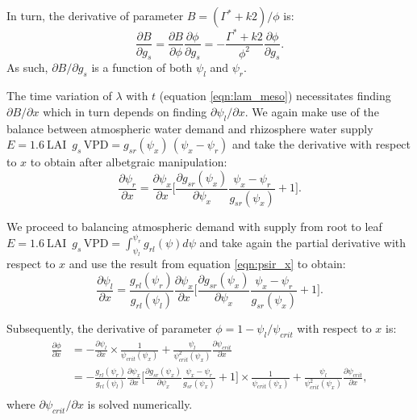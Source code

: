 \documentclass[utf8]{frontiersSCNS} %
\begin{document}
In turn, the derivative of parameter $B = (\Gamma^* + k2) / \phi$ is:
\begin{equation}
    \label{eqn:B_gs}
    \frac{\partial B}{\partial g_s} = \frac{\partial B}{\partial \phi} \frac{\partial \phi}{\partial g_s} = -\frac{\Gamma^* + k2}{\phi^2} \frac{\partial \phi}{\partial g_s}.
\end{equation}
As such, $\partial B / \partial g_s$ is a function of both $\psi_l$ and $\psi_r$.

The time variation of $\lambda$ with $t$ (equation \ref{eqn:lam_meso}) necessitates finding $\partial B / \partial x$ which in turn depends on finding $\partial \psi_l / \partial x$. We again make use of the balance between atmospheric water demand and rhizosphere water supply $E = 1.6\: \text{LAI }\, g_s\, \text{VPD} = g_{sr}(\psi_x)\, (\psi_x - \psi_r) $ and take the derivative with respect to $x$ to obtain after albetgraic manipulation:
\begin{equation}
    \label{eqn:psir_x}
    \frac{\partial \psi_r}{\partial x} = \frac{\partial \psi_x}{\partial x}\Bigg[ \frac{\partial g_{sr}(\psi_x)}{\partial \psi_x} \frac{\psi_x - \psi_r}{g_{sr}(\psi_x)} + 1 \Bigg].
\end{equation}

We proceed to balancing atmospheric demand with supply from root to leaf $E = 1.6\: \text{LAI }\, g_s\, \text{VPD} = \int_{\psi_l}^{\psi_r} g_{rl}(\psi) d\psi $ and take again the partial derivative with respect to $x$ and use the result from equation \ref{eqn:psir_x} to obtain:
\begin{equation}
    \label{eqn:psil_x}
    \frac{\partial \psi_l}{\partial x} = \frac{g_{rl}(\psi_r)}{g_{rl}(\psi_l)}\frac{\partial \psi_x}{\partial x}\Bigg[ \frac{\partial g_{sr}(\psi_x)}{\partial \psi_x} \frac{\psi_x - \psi_r}{g_{sr}(\psi_x)} + 1 \Bigg].
\end{equation}

Subsequently, the derivative of parameter $\phi = 1 - \psi_l / \psi_{crit}$ with respect to $x$ is:
\begin{equation}
    \label{eqn:phi_x}
    \begin{split}
        \frac{\partial \phi}{\partial x} &= - \frac{\partial \psi_l}{\partial x} \times \frac{1}{\psi_{crit}(\psi_x)} + \frac{\psi_l}{\psi_{crit}^2(\psi_x)} \frac{\partial \psi_{crit}}{\partial x}\\
        &= - \frac{g_{rl}(\psi_r)}{g_{rl}(\psi_l)}\frac{\partial \psi_x}{\partial x}\Bigg[ \frac{\partial g_{sr}(\psi_x)}{\partial \psi_x} \frac{\psi_x - \psi_r}{g_{sr}(\psi_x)} + 1 \Bigg] \times \frac{1}{\psi_{crit}(\psi_x)}+ \frac{\psi_l}{\psi_{crit}^2(\psi_x)} \frac{\partial \psi_{crit}}{\partial x},\\
    \end{split}
\end{equation}
where $\partial \psi_{crit} / \partial x$ is solved numerically.
\end{document}
